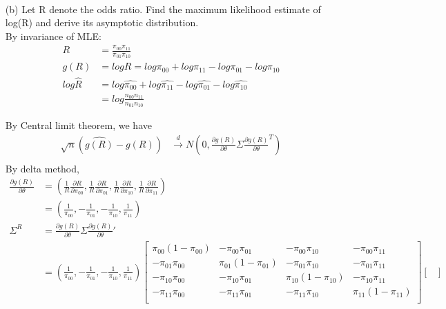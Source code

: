 \documentclass[11pt]{article} %
\begin{document}
\begin{itemize}
\begin{align*}
	\end{align*}
	\item[(b)] Let R denote the odds ratio. Find the maximum likelihood estimate of log(R) and
	derive its asymptotic distribution.\\
	By invariance of MLE:
	\begin{align*}
		R & =  \frac{\pi_{00}\pi_{11}}{\pi_{01}\pi_{10}}\\
		g(R) &= log R = log \pi_{00} + log \pi_{11}- log \pi_{01}- log \pi_{10}\\
		log \hat{R} & = log \hat{\pi_{00}} + log \hat{\pi_{11}}- log \hat{\pi_{01}}- log \hat{\pi_{10}}\\
		&= log \frac{n_{00}n_{11}}{n_{01}n_{10}}
	\end{align*}
	
	By Central limit theorem, we have 
	\begin{align*}
		\sqrt{n} \left(\hat{g(R)} - g(R) \right) & \xrightarrow[]{d} N \left(0, \frac{\partial g(R)}{\partial \theta} \Sigma   \frac{\partial g(R)}{\partial \theta}^T \right) \\
	\end{align*}
	By delta method,
	\begin{align*}
		\frac{\partial g(R)}{\partial \theta} &= \left(
		\frac{1}{R} \frac{\partial R}{\partial \pi_{00}} ,  \frac{1}{R}\frac{\partial R}{\partial \pi_{01}},   \frac{1}{R}\frac{\partial R}{\partial \pi_{10}} ,  \frac{1}{R} \frac{\partial R}{\partial \pi_{11}} \right)\\
		& = \left( \frac{1}{\pi_{00}},  -\frac{1}{\pi_{01}},  -\frac{1}{\pi_{10}}, \frac{1}{\pi_{11}} \right)\\
		\Sigma^{R} &= \frac{\partial g(R)}{\partial \theta} \Sigma \frac{\partial g(R)}{\partial \theta}' \\
		&= \left( \frac{1}{\pi_{00}},  -\frac{1}{\pi_{01}},  -\frac{1}{\pi_{10}}, \frac{1}{\pi_{11}} \right) \begin{bmatrix}
			\pi_{00}(1-\pi_{00}) &  -\pi_{00}\pi_{01}&  -\pi_{00}\pi_{10} &  -\pi_{00}\pi_{11}\\
			-\pi_{01}\pi_{00} & \pi_{01}(1-\pi_{01}) & -\pi_{01}\pi_{10}   & -\pi_{01}\pi_{11}  \\
			-\pi_{10}\pi_{00} & -\pi_{10}\pi_{01} &  \pi_{10}(1-\pi_{10})  & -\pi_{10}\pi_{11}  \\
			-\pi_{11}\pi_{00} &  -\pi_{11}\pi_{01} & -\pi_{11}\pi_{10}   & \pi_{11}(1-\pi_{11})  \\
		\end{bmatrix} \begin{bmatrix}

\end{bmatrix}
\end{align*}
\end{itemize}
\end{document}
